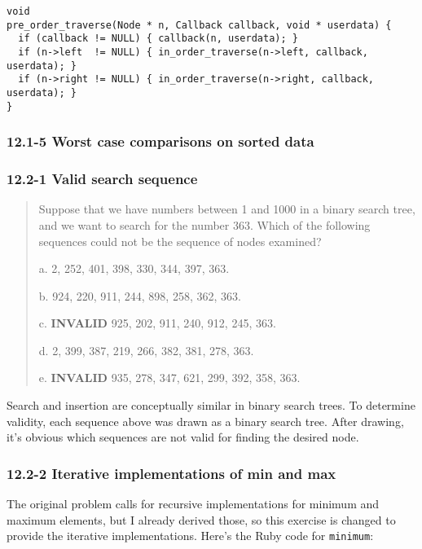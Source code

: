 \documentclass{article}
\begin{document}
\begin{lstlisting}[frame=single,title=Pre-order traverse]
void
pre_order_traverse(Node * n, Callback callback, void * userdata) {
  if (callback != NULL) { callback(n, userdata); }
  if (n->left  != NULL) { in_order_traverse(n->left, callback, userdata); }
  if (n->right != NULL) { in_order_traverse(n->right, callback, userdata); }
}
\end{lstlisting}


\subsubsection{12.1-5 Worst case comparisons on sorted data}

\subsubsection{12.2-1 Valid search sequence}

\begin{quote}
Suppose that we have numbers between 1 and 1000 in a binary search tree, and we
want to search for the number 363. Which of the following sequences could not be
the sequence of nodes examined?

a. 2, 252, 401, 398, 330, 344, 397, 363.

b. 924, 220, 911, 244, 898, 258, 362, 363.

c. \textbf{INVALID} 925, 202, 911, 240, 912, 245, 363.

d. 2, 399, 387, 219, 266, 382, 381, 278, 363.

e. \textbf{INVALID} 935, 278, 347, 621, 299, 392, 358, 363.
\end{quote}

Search and insertion are conceptually similar in binary search
trees. To determine validity, each sequence above was drawn as
a binary search tree. After drawing, it's obvious which sequences
are not valid for finding the desired node.

\subsubsection{12.2-2 Iterative implementations of min and max}

The original problem calls for recursive implementations for minimum
and maximum elements, but I already derived those, so this exercise
is changed to provide the iterative implementations. Here's the
Ruby code for \texttt{minimum}:
\end{document}
